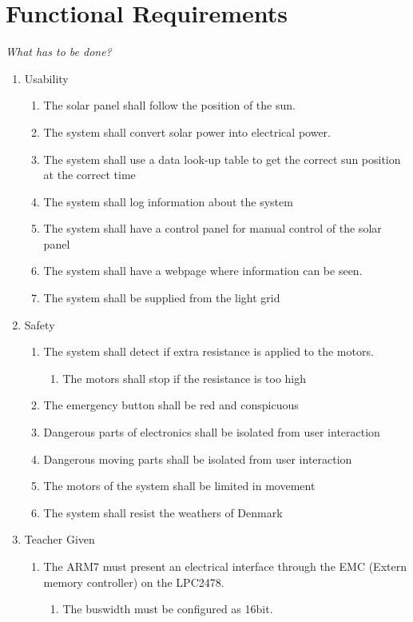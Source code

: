 \documentclass[12pt,a4paper]{report}
\begin{document}
\section{Functional Requirements}
\textit{What has to be done?}
\begin{enumerate}
\item	Usability
\begin{enumerate}
	\item	The solar panel shall follow the position of the sun.
	\item	The system shall convert solar power into electrical power.
	\item	The system shall use a data look-up table to get the correct sun position at the correct time
	\item	The system shall log information about the system
	\item	The system shall have a control panel for manual control of the solar panel
	\item	The system shall have a webpage where information can be seen.
	\item	The system shall be supplied from the light grid
\end{enumerate}
\item	Safety
\begin{enumerate}
	\item	The system shall detect if extra resistance is applied to the motors.
	\begin{enumerate}
		\item	The motors shall stop if the resistance is too high
		\end{enumerate}
	\item	The emergency button shall be red and conspicuous
	\item	Dangerous parts of electronics shall be isolated from user interaction
	\item	Dangerous moving parts shall be isolated from user interaction
	\item	The motors of the system shall be limited in movement
	\item	The system shall resist the weathers of Denmark
\end{enumerate}
\item Teacher Given
\begin{enumerate}
	\item The ARM7 must present an electrical interface through the EMC (Extern memory controller) on the LPC2478.
	\begin{enumerate}
		\item The buswidth must be configured as 16bit.

\end{enumerate}
\end{enumerate}
\end{enumerate}
\end{document}
